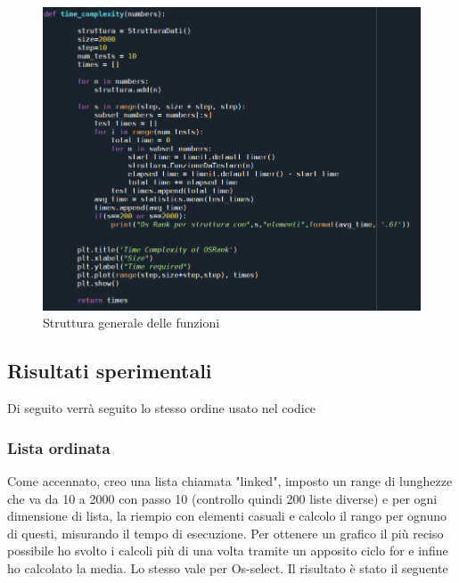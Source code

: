 \begin{figure}[H]
    \centering
     \includegraphics[width=1\textwidth]{Images/CODE_SAMPLE.png}
    \caption{Struttura generale delle funzioni}
\end{figure}

\subsection{Risultati sperimentali}
Di seguito verrà seguito lo stesso ordine usato nel codice
    \subsubsection{Lista ordinata}
    Come accennato, creo una lista chiamata "linked", imposto un range di lunghezze che va da 10 a 2000 con passo 10 (controllo quindi 200 liste diverse) e per ogni dimensione di lista, la riempio con elementi casuali e calcolo il rango per ognuno di questi, misurando il tempo di esecuzione. Per ottenere un grafico il più reciso possibile ho svolto i calcoli più di una volta tramite un apposito ciclo for e infine ho calcolato la media. Lo stesso vale per Os-select. Il risultato è stato il seguente

